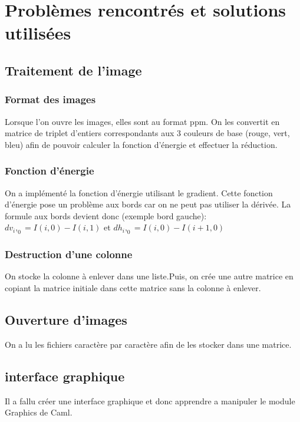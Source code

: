 \documentclass{article}
\begin{document}
\section{Problèmes rencontrés et solutions utilisées}



\subsection{Traitement de l'image}

\subsubsection{Format des images}

Lorsque l'on ouvre les images, elles sont au format ppm. On les convertit en matrice de triplet d'entiers correspondants aux 3 couleurs de base (rouge, vert, bleu) afin de pouvoir calculer la fonction d'énergie et effectuer la réduction. 

\subsubsection{Fonction d'énergie}

On a implémenté la fonction d'énergie utilisant le gradient. Cette fonction d'énergie pose un problème aux bords car on ne peut pas utiliser la dérivée. La formule aux bords devient donc (exemple bord gauche):
$dv_i,_0=I(i,0)-I(i,1)$ et $dh_i,_0 = I(i,0)-I(i+1,0)$

\subsubsection{Destruction d'une colonne}

On stocke la colonne à enlever dans une liste.Puis, on crée une autre matrice en copiant la matrice initiale dans cette matrice sans la colonne à enlever.
 
\subsection{Ouverture d'images}

On a lu les fichiers caractère par caractère afin de les stocker dans une matrice. 


\subsection{interface graphique}
Il a fallu créer une interface graphique et donc apprendre a manipuler le module Graphics de Caml.
\end{document}
